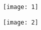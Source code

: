 \documentclass[11pt, twocolumn]{article}
\begin{document}
\begin{figure}[h]
    \centering
    \texttt{[image: 1]}
    \caption{}
    \label{fig:1}
\end{figure}


\begin{figure}[h]
    \centering
    \texttt{[image: 2]}
    \caption{}
    \label{fig:2}
\end{figure}
\end{document}
